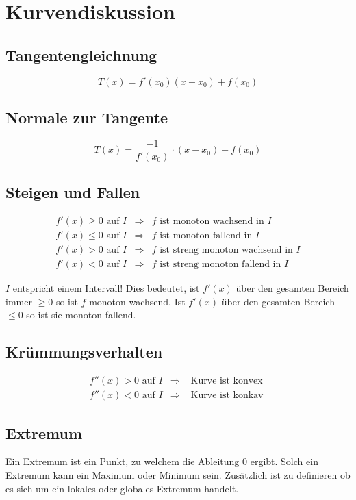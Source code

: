 \section{Kurvendiskussion}

\subsection{Tangentengleichnung}
\[ \boxed{T(x) = f'(x_0)(x - x_0) + f(x_0)} \]

\subsection{Normale zur Tangente}
\[ \boxed{ T(x) = \frac{-1}{f'(x_0)} \cdot (x-x_0) + f(x_0) } \]

\subsection{Steigen und Fallen}

\[ \boxed{ \begin{matrix}
f'(x) \geq 0 \text{ auf } I & \Rightarrow  & f \text{ ist monoton wachsend in $I$} \\
f'(x) \leq 0 \text{ auf } I & \Rightarrow  & f \text{ ist monoton fallend in $I$} \\
f'(x) > 0 \text{ auf } I & \Rightarrow  & f \text{ ist streng monoton wachsend in $I$} \\
f'(x) < 0 \text{ auf } I & \Rightarrow  & f \text{ ist streng monoton fallend in $I$}
\end{matrix} } \]

\noindent
$I$ entspricht einem Intervall! Dies bedeutet, ist $f'(x)$ über den gesamten Bereich immer $\geq 0$ so ist $f$ monoton wachsend.
Ist $f'(x)$ über den gesamten Bereich $\leq 0$ so ist sie monoton fallend.

\subsection{Krümmungsverhalten}

\[ \boxed{ \begin{matrix}
f''(x) > 0 \text{ auf } I & \Rightarrow  & \text{ Kurve ist konvex } \\
f''(x) < 0 \text{ auf } I & \Rightarrow  & \text{ Kurve ist konkav }
\end{matrix} } \]

\subsection{Extremum}
Ein Extremum ist ein Punkt, zu welchem die Ableitung $0$ ergibt.
Solch ein Extremum kann ein Maximum oder Minimum sein.
Zusätzlich ist zu definieren ob es sich um ein lokales oder globales Extremum handelt.

